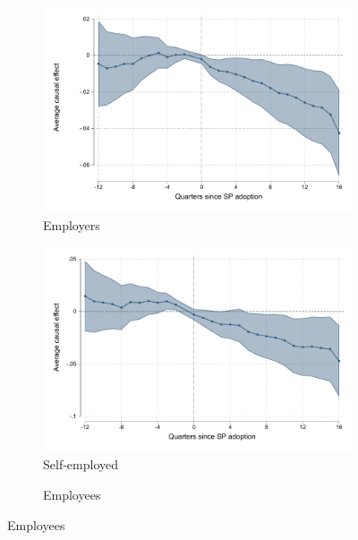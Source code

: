 \begin{figure}[H]
     \caption{Event studies - \cite{Campos} replication}
    \label{es_bc}
\begin{center}
       \begin{subfigure}{0.325\textwidth}
    \caption{Employers}
        \includegraphics[width=\textwidth]{Figuras/did_event_bc_p_t.pdf}
    \end{subfigure}
    \begin{subfigure}{0.325\textwidth}
        \caption{Self-employed}
        \includegraphics[width=\textwidth]{Figuras/did_event_bc_p_1.pdf}
    \end{subfigure}
        \begin{subfigure}{0.325\textwidth}
    \caption{Employees}

\end{subfigure}
\end{center}
\end{figure}
